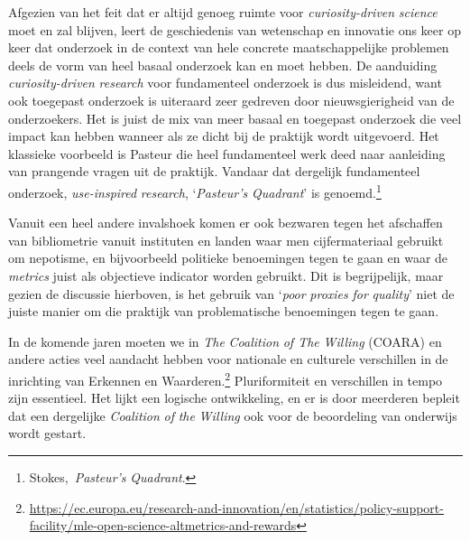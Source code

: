\documentclass[smallauthor, chapterhaspagenum, nochapterinheader, pagenuminheader,  bigchapnum,medium2, tocpages, garamond, titleinheader]{jote-book}
\begin{document}
	Afgezien van het feit dat er altijd genoeg ruimte voor \emph{curiosity-driven}\emph{ }\emph{science} moet en zal blijven, leert de geschiedenis van wetenschap en innovatie ons keer op keer dat onderzoek in de context van hele concrete maatschappelijke problemen deels de vorm van heel basaal onderzoek kan en moet hebben. De aanduiding \emph{curiosity-driven}\emph{ research} voor fundamenteel onderzoek is dus misleidend, want ook toegepast onderzoek is uiteraard zeer gedreven door nieuwsgierigheid van de onderzoekers. Het is juist de mix van meer basaal en toegepast onderzoek die veel impact kan hebben wanneer als ze dicht bij de praktijk wordt uitgevoerd. Het klassieke voorbeeld is Pasteur die heel fundamenteel werk deed naar aanleiding van prangende vragen uit de praktijk. Vandaar dat dergelijk fundamenteel onderzoek, \emph{use-inspired}\emph{ research}, ‘\emph{Pasteur's}\emph{ }\emph{Quadrant}' is genoemd.\footnote{Stokes, \emph{Pasteur's}\emph{ }\emph{Quadrant}.}



	Vanuit een heel andere invalshoek komen er ook bezwaren tegen het afschaffen van bibliometrie vanuit instituten en landen waar men cijfermateriaal gebruikt om nepotisme, en bijvoorbeeld politieke benoemingen tegen te gaan en waar de \emph{metrics} juist als objectieve indicator worden gebruikt. Dit is begrijpelijk, maar gezien de discussie hierboven, is het gebruik van ‘\emph{poor}\emph{ }\emph{proxies}\emph{ }\emph{for}\emph{ }\emph{quality}' niet de juiste manier om die praktijk van problematische benoemingen tegen te gaan.



	In de komende jaren moeten we in \emph{The }\emph{Coalition}\emph{ of The }\emph{Willing} (COARA) en andere acties veel aandacht hebben voor nationale en culturele verschillen in de inrichting van Erkennen en Waarderen.\footnote{\href{https://ec.europa.eu/research-and-innovation/en/statistics/policy-support-facility/mle-open-science-altmetrics-and-rewards}{https://ec.europa.eu/research-and-innovation/en/statistics/policy-support-facility/mle-open-science-altmetrics-and-rewards} } Pluriformiteit en verschillen in tempo zijn essentieel. Het lijkt een logische ontwikkeling, en er is door meerderen bepleit dat een dergelijke \emph{Coalition}\emph{ of }\emph{the}\emph{ }\emph{Willing} ook voor de beoordeling van onderwijs wordt gestart.

	\enlargethispage{-\baselineskip}\checkandfixthelayout
\end{document}
